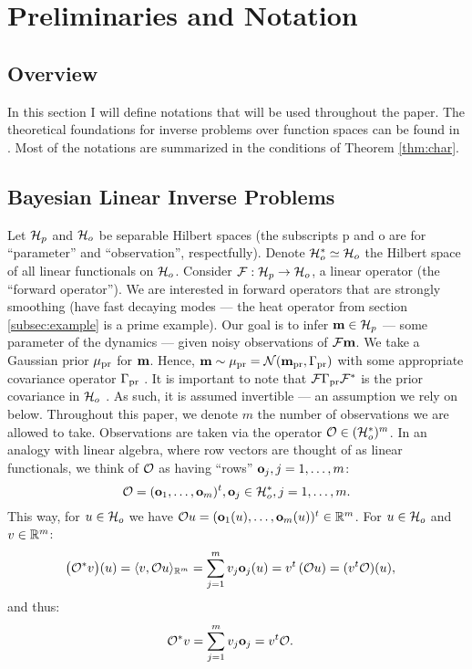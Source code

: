 \section{Preliminaries and Notation}\label{section:prelim}

\subsection{Overview}
In this section I will define notations that will be used throughout
the paper. The theoretical foundations for inverse problems over
function spaces can be found in \cite{Stuart10}. Most of the notations
are summarized in the conditions of Theorem \ref{thm:char}.


\subsection{Bayesian Linear Inverse Problems}\label{subsec:abstract OED}
Let $\mathcal{H}_p$ and $\mathcal{H}_o$ be separable Hilbert spaces (the subscripts p
and o are for ``parameter'' and ``observation'', respectfully). Denote
$\mathcal{H}_o^* \simeq \mathcal{H}_o$ the Hilbert space of all linear functionals on
$\mathcal{H}_o$. Consider $\mathcal{F}: \mathcal{H}_p \to \mathcal{H}_o$, a linear operator (the
``forward operator''). We are interested in forward operators that are
strongly smoothing (have fast decaying modes --- the heat operator
from section \ref{subsec:example} is a prime example). Our goal is to
infer $\mathbf{m} \in \mathcal{H}_p$ --- some parameter of the dynamics --- given
noisy observations of $\mathcal{F} \mathbf{m}$. We take a Gaussian prior $\mu_{\textup{pr}}$
for $\mathbf{m}$. Hence, $\mathbf{m} \sim \mu_{\textup{pr}} = \mathcal{N}(\mathbf{m}_{\textup{pr}} ,\Gamma_{\textup{pr}})$ with
some appropriate covariance operator $\Gamma_{\textup{pr}}$ \cite{Stuart10}. It is
important to note that $\mathcal{F} \Gamma_{\textup{pr}} \mathcal{F}^*$ is the prior covariance in
$\mathcal{H}_o$ \cite{Stuart10}. As such, it is assumed invertible --- an
assumption we rely on below. Throughout this paper, we denote $m$ the
number of observations we are allowed to take. Observations are taken
via the operator $\mathcal{O} \in ( \mathcal{H}_o^* )^m$. In an analogy with linear
algebra, where row vectors are thought of as linear functionals, we
think of $\mathcal{O}$ as having ``rows'' $\mathbf{o}_j, j=1,\dots,m$:
\begin{equation}\label{eq:O}
  \obs = (\meas_1,\dots, \meas_m)^t, \meas_j \in \hilo^*, j = 1,\dots,m.
\end{equation}
This way, for $u \in \mathcal{H}_o$ we have $\mathcal{O} u = (\mathbf{o}_1(u), \dots,
\mathbf{o}_m(u) )^t \in \mathbb{R}^m$.
For $u \in \mathcal{H}_o$ and $v\in \mathbb{R}^m$:
\begin{align*}
  \big (\obs^*v \big ) (u) &= \langle v, \obs u \rangle_{\R^m} = \sum_{j=1}^m  v_j \meas_j(u)
  = v^t \left ( \obs u \right ) = (v^t \obs) (u),
\end{align*}
and thus:
\begin{align}\label{eq:obs*}
  \obs^*v &= \sum_{j=1}^m v_j \meas_j = v^t \obs.
\end{align}

